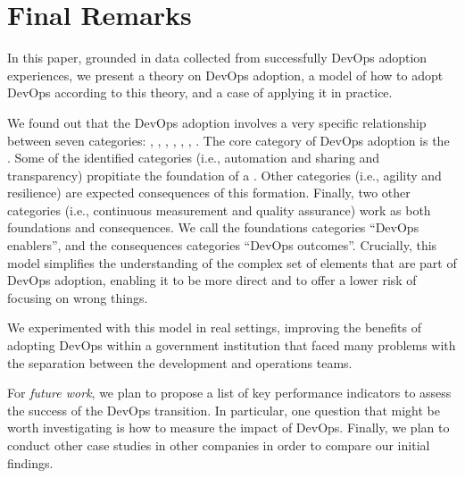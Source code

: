 \section{Final Remarks} \label{sec:conclusion}

In this paper, grounded in data collected from successfully DevOps adoption
experiences, we present a theory on DevOps adoption, a model of how to adopt
DevOps according to this theory, and a case of applying it in practice.

We found out that the DevOps adoption involves a very specific relationship between
seven categories: , , \cc, , , , .
The core category of DevOps adoption is the \cc. Some of the
identified categories (i.e., automation and sharing and transparency) propitiate
the foundation of a \cc. Other categories
(i.e., agility and resilience) are expected consequences of this formation.
Finally, two other categories (i.e., continuous measurement and quality
assurance) work as both foundations and consequences. We call the foundations
categories ``DevOps enablers'', and the consequences categories ``DevOps outcomes''.
Crucially, this model simplifies the understanding of the
complex set of elements that are part of DevOps adoption, enabling it to be
more direct and to offer a lower risk of focusing on wrong things.

We experimented with
this model in real settings, improving the benefits of adopting DevOps
within a government institution that faced many problems with the separation between the
development and operations teams.

For \emph{future work}, we plan to propose a list of key performance indicators to
assess the success of the DevOps transition. In particular, one question that
might be worth investigating is how to measure the impact of DevOps. Finally,
we plan to conduct other case studies in other companies in order to compare
our initial findings.
